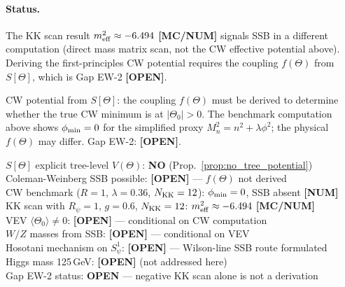 \documentclass[12pt,a4paper]{article}
\begin{document}
\paragraph{Status.}
The KK scan result $m_{\rm eff}^2\approx -6.494$ \textbf{[MC/NUM]} signals
SSB in a different computation (direct mass matrix scan, not the
CW effective potential above).  Deriving the first-principles CW
potential requires the coupling $f(\Theta)$ from $S[\Theta]$, which
is Gap EW-2 \textbf{[OPEN]}.

\begin{openproblembox}
CW potential from $S[\Theta]$: the coupling $f(\Theta)$ must be
derived to determine whether the true CW minimum is at
$|\Theta_0|>0$.  The benchmark computation above shows
$\phi_{\rm min}=0$ for the simplified proxy $M_n^2=n^2+\lambda\phi^2$;
the physical $f(\Theta)$ may differ.
Gap EW-2: \textbf{[OPEN]}.
\end{openproblembox}

\begin{statusbox}
$S[\Theta]$ explicit tree-level $V(\Theta)$: \textbf{NO} (Prop.~\ref{prop:no_tree_potential})\\
Coleman-Weinberg SSB possible: \textbf{[OPEN]} — $f(\Theta)$ not derived\\
CW benchmark ($R=1$, $\lambda=0.36$, $N_{\rm KK}=12$): $\phi_{\rm min}=0$, SSB absent \textbf{[NUM]}\\
KK scan with $R_\psi=1$, $g=0.6$, $N_{\rm KK}=12$: $m_{\rm eff}^2\approx -6.494$ \textbf{[MC/NUM]}\\
VEV $\langle\Theta_0\rangle \neq 0$: \textbf{[OPEN]} — conditional on CW computation\\
$W/Z$ masses from SSB: \textbf{[OPEN]} — conditional on VEV\\
Hosotani mechanism on $S^1_\psi$: \textbf{[OPEN]} — Wilson-line SSB route formulated\\
Higgs mass 125\,GeV: \textbf{[OPEN]} (not addressed here)\\
Gap EW-2 status: \textbf{OPEN} — negative KK scan alone is not a derivation
\end{statusbox}
\end{document}
